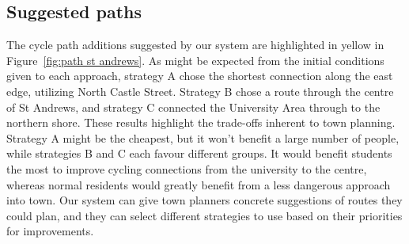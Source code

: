 \documentclass[12pt,a4paper]{report}
\begin{document}
\subsection{Suggested paths}\label{sec:paths}
The cycle path additions suggested by our system are highlighted in yellow in Figure~\ref{fig:path st andrews}. As might be expected from the initial conditions given to each approach, strategy A chose the shortest connection along the east edge, utilizing North Castle Street. Strategy B chose a route through the centre of St Andrews, and strategy C connected the University Area through to the northern shore. These results highlight the trade-offs inherent to town planning. Strategy A might be the cheapest, but it won't benefit a large number of people, while strategies B and C each favour different groups. It would benefit students the most to improve cycling connections from the university to the centre, whereas normal residents would greatly benefit from a less dangerous approach into town. Our system can give town planners concrete suggestions of routes they could plan, and they can select different strategies to use based on their priorities for improvements.
\end{document}

